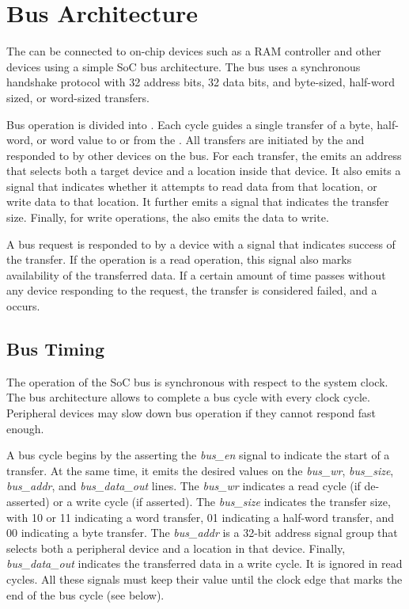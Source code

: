 \section{Bus Architecture}

The \eco can be connected to on-chip devices such as a RAM controller and other devices using a simple SoC bus architecture. The bus uses a synchronous handshake protocol with 32 address bits, 32 data bits, and byte-sized, half-word sized, or word-sized transfers.

Bus operation is divided into . Each cycle guides a single transfer of a byte, half-word, or word value to or from the \ecox. All transfers are initiated by the \eco and responded to by other devices on the bus. For each transfer, the \eco emits an address that selects both a target device and a location inside that device. It also emits a signal that indicates whether it attempts to read data from that location, or write data to that location. It further emits a signal that indicates the transfer size. Finally, for write operations, the \eco also emits the data to write.

A bus request is responded to by a device with a signal that indicates success of the transfer. If the operation is a read operation, this signal also marks availability of the transferred data. If a certain amount of time passes without any device responding to the request, the transfer is considered failed, and a  occurs.

\subsection{Bus Timing}

The operation of the SoC bus is synchronous with respect to the system clock. The bus architecture allows to complete a bus cycle with every clock cycle. Peripheral devices may slow down bus operation if they cannot respond fast enough.

A bus cycle begins by the \eco asserting the {\it bus\_en} signal to indicate the start of a transfer. At the same time, it emits the desired values on the {\it bus\_wr}, {\it bus\_size}, {\it bus\_addr}, and {\it bus\_data\_out} lines. The {\it bus\_wr} indicates a read cycle (if de-asserted) or a write cycle (if asserted). The {\it bus\_size} indicates the transfer size, with 10 or 11 indicating a word transfer, 01 indicating a half-word transfer, and 00 indicating a byte transfer. The {\it bus\_addr} is a 32-bit address signal group that selects both a peripheral device and a location in that device. Finally, {\it bus\_data\_out} indicates the transferred data in a write cycle. It is ignored in read cycles. All these signals must keep their value until the clock edge that marks the end of the bus cycle (see below).

